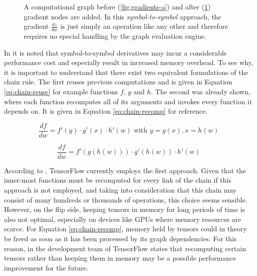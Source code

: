 \begin{figure}
\begin{subfigure}[b]{0.2\textwidth}
    \caption{}
    \label{fig:gradients-b}
  \end{subfigure}
  \caption{A computational graph before (\ref{fig:gradients-a}) and after
    (\ref{fig:gradients-b}) gradient nodes are added. In this
    \emph{symbol-to-symbol} approach, the gradient $\frac{dz}{dw}$ is just
    simply an operation like any other and therefore requires no special
    handling by the graph evaluation engine.}
  \label{fig:gradients}
\end{figure}

In \cite{tensorflow} it is noted that symbol-to-symbol derivatives may incur a
considerable performance cost and especially result in increased memory
overhead. To see why, it is important to understand that there exist two
equivalent formulations of the chain rule. The first reuses previous
computations and is given in Equation \ref{eq:chain-reuse} for example functions
$f$, $g$ and $h$. The second was already shown, where each function recomputes
all of its arguments and invokes every function it depends on. It is given in
Equation \ref{eq:chain-recomp} for reference.

\begin{equation}\label{eq:chain-reuse}
  \frac{d f}{d w} = f'(y) \cdot g'(x) \cdot h'(w) \text{ with } y = g(x), x =
  h(w)
\end{equation}

\begin{equation}\label{eq:chain-recomp}
  \frac{d f}{d w} = f'(g(h(w))) \cdot g'(h(w)) \cdot h'(w)
\end{equation}

According to \cite{tensorflow}, TensorFlow currently employs the first
approach. Given that the inner-most functions must be recomputed for every link
of the chain if this approach is not employed, and taking into consideration
that this chain may consist of many hundreds or thousands of operations, this
choice seems sensible. However, on the flip side, keeping tensors in memory for
long periods of time is also not optimal, especially on devices like GPUs where
memory resources are scarce. For Equation \ref{eq:chain-recomp}, memory held by
tensors could in theory be freed as soon as it has been processed by its graph
dependencies. For this reason, in \cite{tensorflow} the development team of
TensorFlow states that recomputing certain tensors rather than keeping them in
memory may be a possible performance improvement for the future.

